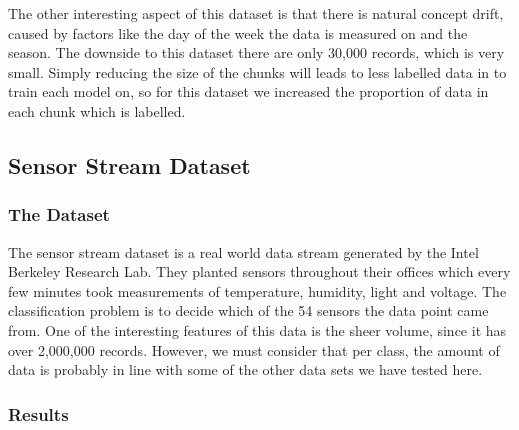 \documentclass[12pt,a4paper,oneside]{report}
\begin{document}
The other interesting aspect of this dataset is that there is natural concept drift, caused by factors like the  day of the week the data is measured on and the season. The downside to this dataset there are only 30,000 records, which is very small. Simply reducing the size of the chunks will leads to less labelled data in to train each model on, so for this dataset we increased the proportion of data in each chunk which is labelled. 

\subsection*{Sensor Stream Dataset}
\subsubsection*{The Dataset}
The sensor stream dataset is a real world data stream generated by the Intel Berkeley Research Lab. They planted sensors throughout their offices which every few minutes took measurements of temperature, humidity, light and voltage. The classification problem is to decide which of the 54 sensors the data point came from. One of the interesting features of this data is the sheer volume, since it has over 2,000,000 records. However, we must consider that per class, the amount of data is probably in line with some of the other data sets we have tested here.  

\subsubsection*{Results}
\end{document}
